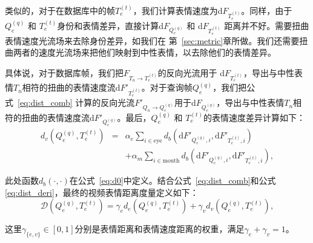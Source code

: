 类似的，对于在数据库中的帧$T_e^{(t)}$，我们计算表情速度为d\mbox{\boldmath $F$}$_{T_e^{(t)}}$。同样，由于$Q_e^{(q)}$ 和 $T_e^{(t)}$身份和表情差异，直接计算d\mbox{\boldmath $F$}$_{Q_e^{(q)}}$ 和 d\mbox{\boldmath $F$}$_{T_e^{(t)}}$ 距离并不好。需要扭曲表情速度光流场来去除身份差异，如我们在
第~\ref{sec:metric}章所做。我们还需要扭曲两者的速度光流场来把他们映射到中性表情，以去除他们的表情差异。

具体说，对于数据库帧，我们把\mbox{\boldmath $F$}$_{T_n\to T_e^{(t)}}$的反向光流用于 d\mbox{\boldmath $F$}$_{T_e^{(t)}}$，导出与中性表情$T_n$相符的扭曲的表情速度流d\mbox{\boldmath $F$}$'_{T_e^{(t)}}$。对于查询帧$Q_e^{(q)}$，我们把公式~\ref{eq:dist_comb} 计算的反向光流\mbox{\boldmath $F$}$'_{Q_n\to Q_e^{(q)}}$用于d\mbox{\boldmath $F$}$_{Q_e^{(q)}}$，导出与中性表情$T_n$相符的扭曲的表情速度流d\mbox{\boldmath $F$}$'_{Q_e^{(q)}}$。最后，$Q_e^{(q)}$ 和 $T_e^{(t)}$的表情速度差异计算如下：
\begin{eqnarray}\label{eq:dist_deri}
d_v(Q_e^{(q)}, T_e^{(t)})&=& \alpha_{e}\sum_{i\in\text{eye}}d_b(\text{d}F'_{Q_e^{(q)}, i}, \text{d}F'_{T_e^{(t)}, i})\nonumber\\
           &&+\alpha_{m}\sum_{i\in\text{mouth}}d_b(\text{d}F'_{Q_e^{(q)}, i}, \text{d}F'_{T_e^{(t)}, i}),
\end{eqnarray}

此处函数$d_b(\cdot,\cdot)$在公式~\ref{eq:d0}中定义。结合公式~\ref{eq:dist_comb}和公式\ref{eq:dist_deri}，最终的视频表情距离度量定义如下：
\begin{equation}\label{eq:dist_all}
\mathcal{D}(Q_e^{(q)}, T_e^{(t)})=\gamma_e d_e(Q_e^{(q)}, T_e^{(t)})+ \gamma_v d_v(Q_e^{(q)}, T_e^{(t)}),
\end{equation}

这里$\gamma_{\{e,v\}}\in[0,1]$分别是表情距离和表情速度距离的权重，满足$\gamma_e+\gamma_v=1$。

